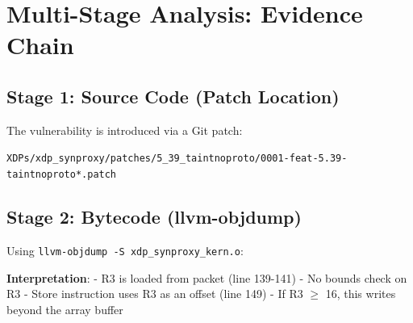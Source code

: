 \section{Multi-Stage Analysis: Evidence Chain}

\subsection{Stage 1: Source Code (Patch Location)}

The vulnerability is introduced via a Git patch:
\begin{tcolorbox}[colback=gray!10, colframe=gray!10, arc=2pt, boxrule=0pt]
\small\ttfamily
\texttt{XDPs/xdp\_synproxy/patches/5\_39\_taintnoproto/0001-feat-5.39-taintnoproto*.patch}
\end{tcolorbox}

\subsection{Stage 2: Bytecode (llvm-objdump)}

Using \texttt{llvm-objdump -S xdp\_synproxy\_kern.o}:

\vspace{0.3cm}
\noindent
{}
\vspace{0.3cm}

\noindent
\textbf{Interpretation}:
- R3 is loaded from packet (line 139-141)
- No bounds check on R3
- Store instruction uses R3 as an offset (line 149)
- If R3 $\geq$ 16, this writes beyond the array buffer


